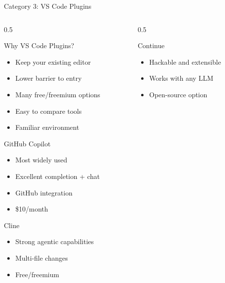 \documentclass[aspectratio=169,11pt]{beamer}
\begin{document}
\begin{frame}{Category 3: VS Code Plugins}
    \begin{columns}[T]
        \begin{column}{0.5\textwidth}
            \begin{block}{Why VS Code Plugins?}
                \begin{itemize}
                    \item Keep your existing editor
                    \item Lower barrier to entry
                    \item Many free/freemium options
                    \item Easy to compare tools
                    \item Familiar environment
                \end{itemize}
            \end{block}

            \begin{exampleblock}{GitHub Copilot}
                \begin{itemize}
                    \item Most widely used
                    \item Excellent completion + chat
                    \item GitHub integration
                    \item \$10/month
                \end{itemize}
            \end{exampleblock}

            \begin{block}{Cline}
                \begin{itemize}
                    \item Strong agentic capabilities
                    \item Multi-file changes
                    \item Free/freemium
                \end{itemize}
            \end{block}
        \end{column}
        \begin{column}{0.5\textwidth}
            \begin{block}{Continue}
                \begin{itemize}
                    \item Hackable and extensible
                    \item Works with any LLM
                    \item Open-source option
                \end{itemize}
            \end{block}


\end{column}
\end{columns}
\end{frame}
\end{document}
